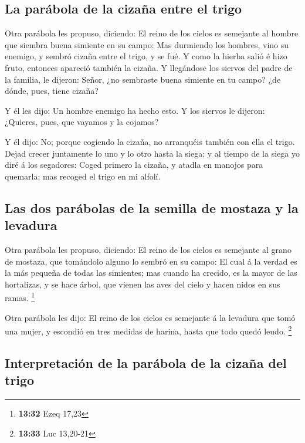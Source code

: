\hypertarget{la-paruxe1bola-de-la-cizauxf1a-entre-el-trigo}{%
\subsection{La parábola de la cizaña entre el
trigo}\label{la-paruxe1bola-de-la-cizauxf1a-entre-el-trigo}}

 Otra parábola les propuso, diciendo: El reino de los
cielos es semejante al hombre que siembra buena simiente en su campo:
 Mas durmiendo los hombres, vino su enemigo, y sembró
cizaña entre el trigo, y se fué.  Y como la hierba salió
é hizo fruto, entonces apareció también la cizaña.  Y
llegándose los siervos del padre de la familia, le dijeron: Señor, ¿no
sembraste buena simiente en tu campo? ¿de dónde, pues, tiene cizaña?

 Y él les dijo: Un hombre enemigo ha hecho esto. Y los
siervos le dijeron: ¿Quieres, pues, que vayamos y la cojamos?

 Y él dijo: No; porque cogiendo la cizaña, no arranquéis
también con ella el trigo.  Dejad crecer juntamente lo
uno y lo otro hasta la siega; y al tiempo de la siega yo diré á los
segadores: Coged primero la cizaña, y atadla en manojos para quemarla;
mas recoged el trigo en mi alfolí.

\hypertarget{las-dos-paruxe1bolas-de-la-semilla-de-mostaza-y-la-levadura}{%
\subsection{Las dos parábolas de la semilla de mostaza y la
levadura}\label{las-dos-paruxe1bolas-de-la-semilla-de-mostaza-y-la-levadura}}

 Otra parábola les propuso, diciendo: El reino de los
cielos es semejante al grano de mostaza, que tomándolo alguno lo sembró
en su campo:  El cual á la verdad es la más pequeña de
todas las simientes; mas cuando ha crecido, es la mayor de las
hortalizas, y se hace árbol, que vienen las aves del cielo y hacen nidos
en sus ramas. \footnote{\textbf{13:32} Ezeq 17,23}

 Otra parábola les dijo: El reino de los cielos es
semejante á la levadura que tomó una mujer, y escondió en tres medidas
de harina, hasta que todo quedó leudo. \footnote{\textbf{13:33} Luc
  13,20-21}

\hypertarget{interpretaciuxf3n-de-la-paruxe1bola-de-la-cizauxf1a-del-trigo}{%
\subsection{Interpretación de la parábola de la cizaña del
trigo}\label{interpretaciuxf3n-de-la-paruxe1bola-de-la-cizauxf1a-del-trigo}}

